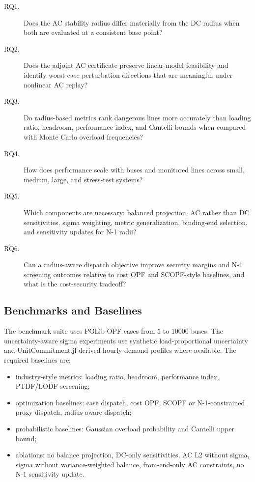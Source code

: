 \documentclass[energies,article,submit,pdftex,moreauthors]{Definitions/mdpi}
\begin{document}
\begin{description}
  \item[RQ1.] Does the AC stability radius differ materially from the DC radius when both are evaluated at a consistent base point?
  \item[RQ2.] Does the adjoint AC certificate preserve linear-model feasibility and identify worst-case perturbation directions that are meaningful under nonlinear AC replay?
  \item[RQ3.] Do radius-based metrics rank dangerous lines more accurately than loading ratio, headroom, performance index, and Cantelli bounds when compared with Monte Carlo overload frequencies?
  \item[RQ4.] How does performance scale with buses and monitored lines across small, medium, large, and stress-test systems?
  \item[RQ5.] Which components are necessary: balanced projection, AC rather than DC sensitivities, sigma weighting, metric generalization, binding-end selection, and sensitivity updates for N-1 radii?
  \item[RQ6.] Can a radius-aware dispatch objective improve security margins and N-1 screening outcomes relative to cost OPF and SCOPF-style baselines, and what is the cost-security tradeoff?
\end{description}

\subsection{Benchmarks and Baselines}

The benchmark suite uses PGLib-OPF cases from 5 to 10000 buses. The uncertainty-aware sigma experiments use synthetic load-proportional uncertainty and UnitCommitment.jl-derived hourly demand profiles where available. The required baselines are:
\begin{itemize}
  \item industry-style metrics: loading ratio, headroom, performance index, PTDF/LODF screening;
  \item optimization baselines: case dispatch, cost OPF, SCOPF or N-1-constrained proxy dispatch, radius-aware dispatch;
  \item probabilistic baselines: Gaussian overload probability and Cantelli upper bound;
  \item ablations: no balance projection, DC-only sensitivities, AC L2 without sigma, sigma without variance-weighted balance, from-end-only AC constraints, no N-1 sensitivity update.
\end{itemize}
\end{document}

